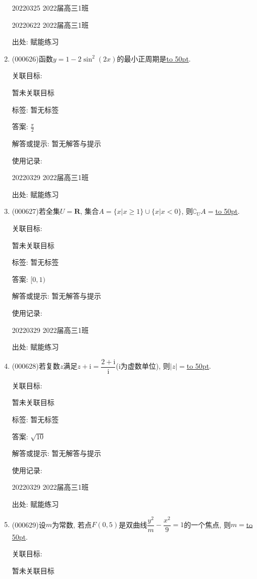 \documentclass[10pt,a4paper]{article}
\newcommand{\blank}[1]{\underline{\hbox to #1pt{}}}
\begin{document}
\begin{enumerate}[1.]
20220325	2022届高三1班	

20220622	2022届高三1班  	


出处: 赋能练习
\item { (000626)}函数$y=1-2\sin^2(2x)$的最小正周期是\blank{50}.


关联目标:

暂未关联目标



标签: 暂无标签

答案: $\frac{\pi}2$

解答或提示: 暂无解答与提示

使用记录:

20220329	2022届高三1班	


出处: 赋能练习
\item { (000627)}若全集$U=\mathbf{R}$, 集合$A=\{x|x\ge 1\}\cup\{x|x<0\}$, 则$\complement_U A=$\blank{50}.


关联目标:

暂未关联目标



标签: 暂无标签

答案: $[0,1)$

解答或提示: 暂无解答与提示

使用记录:

20220329	2022届高三1班	


出处: 赋能练习
\item { (000628)}若复数$z$满足$z+\mathrm{i}=\dfrac{2+\mathrm{i}}{\mathrm{i}}$($\mathrm{i}$为虚数单位), 则$|z|=$\blank{50}.


关联目标:

暂未关联目标



标签: 暂无标签

答案: $\sqrt{10}$

解答或提示: 暂无解答与提示

使用记录:

20220329	2022届高三1班	


出处: 赋能练习
\item { (000629)}设$m$为常数, 若点$F(0,5)$是双曲线$\dfrac{y^2}m-\dfrac{x^2}9=1$的一个焦点, 则$m=$\blank{50}.


关联目标:

暂未关联目标




\end{enumerate}
\end{document}
